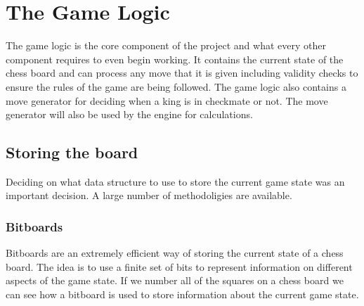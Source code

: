 \documentclass[11pt]{report}
\begin{document}
\tableofcontents



\chapter{The Game Logic}

The game logic is the core component of the project and what every other component requires to even begin working. It contains the current state of the chess board and can process any move that it is given including validity checks to ensure the rules of the game are being followed. The game logic also contains a move generator for deciding when a king is in checkmate or not. The move generator will also be used by the engine for calculations.\newline

\section{Storing the board}

Deciding on what data structure to use to store the current game state was an important decision. A large number of methodoligies are available.

\subsection{Bitboards}

Bitboards are an extremely efficient way of storing the current state of a chess board. The idea is to use a finite set of bits to represent information on different aspects of the game state. If we number all of the squares on a chess board we can see how a bitboard is used to store information about the current game state. \newline
\end{document}
